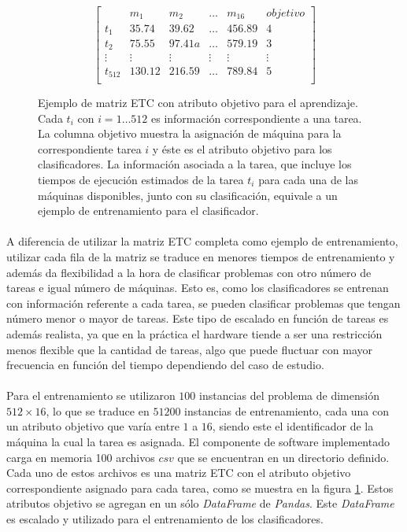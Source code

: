 \begin{figure}[ht!]
\[
\begin{bmatrix}
     & m_1 & m_2 & \dots  & m_{16} & objetivo \\
    t_1 & 35.74 & 39.62 & \dots  & 456.89 & 4 \\
    t_2 & 75.55 & 97.41a & \dots  & 579.19 & 3 \\
    \vdots & \vdots & \vdots & \vdots & \vdots & \vdots\\
    t_{512} & 130.12 & 216.59 & \dots  & 789.84 & 5\\
\end{bmatrix}
\]
\caption{Ejemplo de matriz ETC con atributo objetivo para el aprendizaje. Cada $t_i$ con $i = 1 \dots 512$ es información correspondiente a una tarea. La columna objetivo muestra la asignación de máquina para la correspondiente tarea $i$ y éste es el atributo objetivo para los clasificadores. La información asociada a la tarea, que incluye los tiempos de ejecución estimados de la tarea $t_i$ para cada una de las máquinas disponibles, junto con su clasificación, equivale a un ejemplo de entrenamiento para el clasificador.}
\label{table:datosentrenamiento}
\end{figure}

\paragraph{}A diferencia de utilizar la matriz ETC completa como ejemplo de entrenamiento, utilizar cada fila de la matriz se traduce en menores tiempos de entrenamiento y además da flexibilidad a la hora de clasificar problemas con otro número de tareas e igual número de máquinas. Esto es, como los clasificadores se entrenan con información referente a cada tarea, se pueden clasificar problemas que tengan número menor o mayor de tareas. Este tipo de escalado en función de tareas es además realista, ya que en la práctica el hardware tiende a ser una restricción menos flexible que la cantidad de tareas, algo que puede fluctuar con mayor frecuencia en función del tiempo dependiendo del caso de estudio.

\paragraph{} Para el entrenamiento se utilizaron $100$ instancias del problema de dimensión $512 \times 16$, lo que se traduce en $51200$ instancias de entrenamiento, cada una con un atributo objetivo que varía entre $1$ a $16$, siendo este el identificador de la máquina la cual la tarea es asignada. El componente de software implementado carga en memoria 100 archivos $csv$ que se encuentran en un directorio definido. Cada uno de estos archivos es una matriz ETC con el atributo objetivo correspondiente asignado para cada tarea, como se muestra en la figura \ref{table:datosentrenamiento}. Estos atributos objetivo se agregan en un sólo \textit{DataFrame}\cite{DataFrame-pandas} de \textit{Pandas}. Este \textit{DataFrame} es escalado y utilizado para el entrenamiento de los clasificadores.

